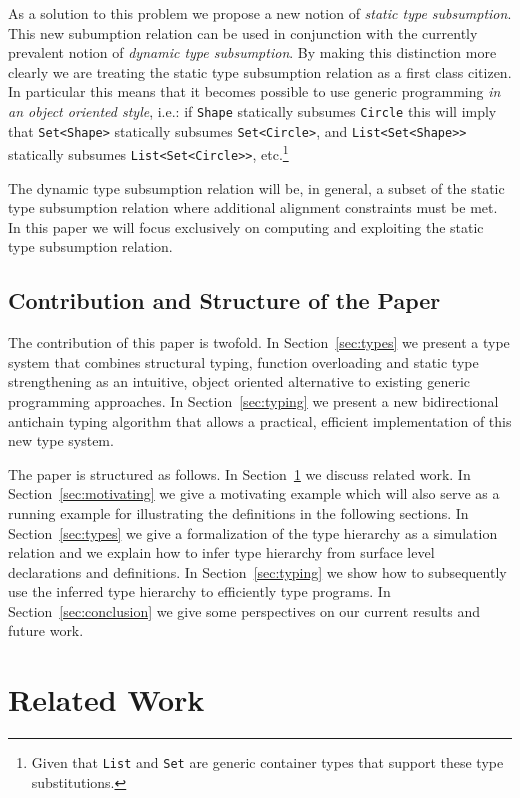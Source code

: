 \documentclass{sigplanconf}
\begin{document}
As a solution to this problem we propose a new notion of \emph{static
  type subsumption}. This new subumption relation can be used in
conjunction with the currently prevalent notion of \emph{dynamic type
  subsumption}. By making this distinction more clearly we are
treating the static type subsumption relation as a first class
citizen. In particular this means that it becomes possible to use
generic programming \emph{in an object oriented style}, i.e.: if
\verb+Shape+ statically subsumes \verb+Circle+ this will imply that
\verb+Set<Shape>+ statically subsumes \verb+Set<Circle>+, and
\verb+List<Set<Shape>>+ statically subsumes \verb+List<Set<Circle>>+,
etc.\footnote{Given that {\tt List} and {\tt Set} are generic
  container types that support these type substitutions.}

The dynamic type subsumption relation will be, in general, a subset of
the static type subsumption relation where additional alignment
constraints must be met. In this paper we will focus exclusively on
computing and exploiting the static type subsumption relation.

\subsection{Contribution and Structure of the Paper}

The contribution of this paper is twofold. In Section~\ref{sec:types}
we present a type system that combines structural typing, function
overloading and static type strengthening as an intuitive, object
oriented alternative to existing generic programming approaches. In
Section~\ref{sec:typing} we present a new bidirectional antichain
typing algorithm that allows a practical, efficient implementation of
this new type system.

The paper is structured as follows.  In Section~\ref{sec:related} we
discuss related work. In Section~\ref{sec:motivating} we give a
motivating example which will also serve as a running example for
illustrating the definitions in the following sections. In
Section~\ref{sec:types} we give a formalization of the type hierarchy
as a simulation relation and we explain how to infer type hierarchy
from surface level declarations and definitions. In
Section~\ref{sec:typing} we show how to subsequently use the inferred
type hierarchy to efficiently type programs. In
Section~\ref{sec:conclusion} we give some perspectives on our current
results and future work.

\section{Related Work}\label{sec:related}
\end{document}
